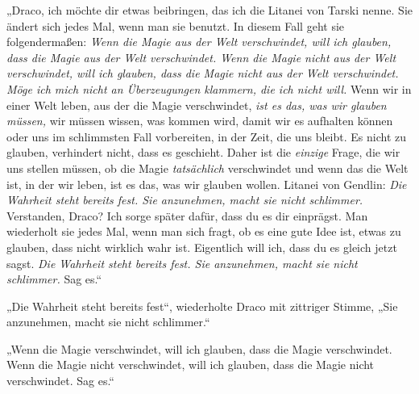 „Draco, ich möchte dir etwas beibringen, das ich die Litanei von Tarski nenne. Sie ändert sich jedes Mal, wenn man sie benutzt. In diesem Fall geht sie folgendermaßen: \emph{Wenn die Magie aus der Welt verschwindet, will ich glauben, dass die Magie aus der Welt verschwindet. Wenn die Magie nicht aus der Welt verschwindet, will ich glauben, dass die Magie nicht aus der Welt verschwindet. Möge ich mich nicht an Überzeugungen klammern, die ich nicht will.} Wenn wir in einer Welt leben, aus der die Magie verschwindet, \emph{ist es das, was wir glauben müssen,} wir müssen wissen, was kommen wird, damit wir es aufhalten können oder uns im schlimmsten Fall vorbereiten, in der Zeit, die uns bleibt. Es nicht zu glauben, verhindert nicht, dass es geschieht. Daher ist die \emph{einzige} Frage, die wir uns stellen müssen, ob die Magie \emph{tatsächlich} verschwindet und wenn das die Welt ist, in der wir leben, ist es das, was wir glauben wollen. Litanei von Gendlin: \emph{Die Wahrheit steht bereits fest. Sie anzunehmen, macht sie nicht schlimmer.} Verstanden, Draco? Ich sorge später dafür, dass du es dir einprägst. Man wiederholt sie jedes Mal, wenn man sich fragt, ob es eine gute Idee ist, etwas zu glauben, dass nicht wirklich wahr ist. Eigentlich will ich, dass du es gleich jetzt sagst. \emph{Die Wahrheit steht bereits fest. Sie anzunehmen, macht sie nicht schlimmer.} Sag es.“%

„Die Wahrheit steht bereits fest“, wiederholte Draco mit zittriger Stimme, „Sie anzunehmen, macht sie nicht schlimmer.“

„Wenn die Magie verschwindet, will ich glauben, dass die Magie verschwindet. Wenn die Magie nicht verschwindet, will ich glauben, dass die Magie nicht verschwindet. Sag es.“


